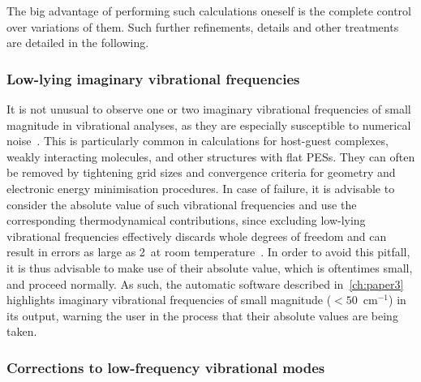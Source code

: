 The big advantage of performing such calculations oneself is the complete control over variations of them.
Such further refinements,
details and other treatments are detailed in the following.

\subsubsection{Low-lying imaginary vibrational frequencies}

It is not unusual to observe one or two imaginary vibrational frequencies of small magnitude in vibrational analyses,
as they are especially susceptible to numerical noise~\cite{Jensen_2015}.
This is particularly common in calculations for host-guest complexes,
weakly interacting molecules,
and other structures with flat PESs.
They can often be removed by tightening grid sizes and convergence criteria for geometry and electronic energy minimisation procedures.
In case of failure,
it is advisable to consider the absolute value of such vibrational frequencies and use the corresponding thermodynamical contributions,
since excluding low-lying vibrational frequencies effectively discards whole degrees of freedom and can result in errors as large as 2~\kcalmol at room temperature~\cite{Jensen_2015}.
In order to avoid this pitfall,
it is thus advisable to make use of their absolute value,
which is oftentimes small,
and proceed normally.
As such,
the automatic software described in~\cref{ch:paper3} highlights imaginary vibrational frequencies of small magnitude ($< 50$~cm$^{-1}$) in its output,
warning the user in the process that their absolute values are being taken.

\subsubsection{Corrections to low-frequency vibrational modes}%
\label{sec:quasi-rrho}

